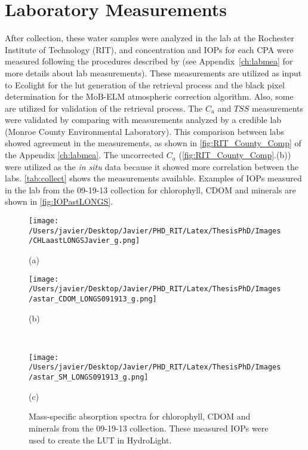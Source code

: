 \section{Laboratory Measurements}
After collection, these water samples were analyzed in the lab at the Rochester Institute of Technology (RIT), and concentration and IOPs for each CPA were measured following the procedures described by \citet{Mueller1995} (see Appendix~\ref{ch:labmea} for more details about lab measurements). These measurements are utilized as input to Ecolight for the \gls{lut} generation of the retrieval process and the black pixel determination for the MoB-ELM atmospheric correction algorithm. Also, some are utilized for validation of the retrieval process. The $C_a$ and $TSS$ measurements were validated by comparing with measurements analyzed by a credible lab (Monroe County Environmental Laboratory). This comparison between labs showed agreement in the measurements, as shown in \autoref{fig:RIT_County_Comp} of the Appendix \ref{ch:labmea}. The uncorrected $C_a$ (\autoref{fig:RIT_County_Comp}.(b)) were utilized as the {\it in situ} data because it showed more correlation between the labs. \autoref{tab:collect} shows the measurements available. Examples of IOPs measured in the lab from the 09-19-13 collection for chlorophyll, CDOM and minerals are shown in \autoref{fig:IOPastLONGS}.

\begin{figure}[htb!]
    \begin{minipage}[c]{0.48\linewidth}
      \centering
    \texttt{[image: /Users/javier/Desktop/Javier/PHD\_RIT/Latex/ThesisPhD/Images/CHLaastLONGSJavier\_g.png]}
     \centerline{(a)}\medskip
    \end{minipage}
    \hfill
    \begin{minipage}[d]{0.48\linewidth}
      \centering
    \texttt{[image: /Users/javier/Desktop/Javier/PHD\_RIT/Latex/ThesisPhD/Images/astar\_CDOM\_LONGS091913\_g.png]}
     \centerline{(b)}\medskip
    \end{minipage}\\
    
    \begin{minipage}[d]{1.0\linewidth}
      \centering
    \texttt{[image: /Users/javier/Desktop/Javier/PHD\_RIT/Latex/ThesisPhD/Images/astar\_SM\_LONGS091913\_g.png]}
      \centerline{(c)}\medskip
    \end{minipage}
  \caption[Mass-specific absorption spectra for chlorophyll, CDOM and minerals from the 09-19-13 collection.]{Mass-specific absorption spectra for chlorophyll, CDOM and minerals from the 09-19-13 collection. These measured IOPs were used to create the LUT in HydroLight. \label{fig:IOPastLONGS} }  
\end{figure}


